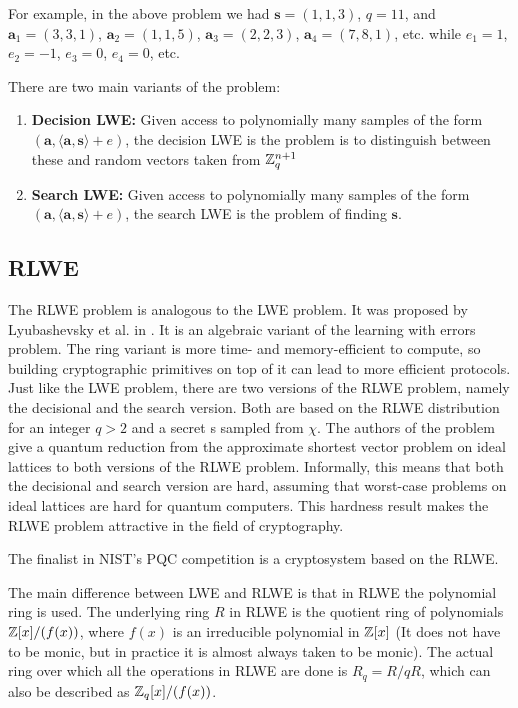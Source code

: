 \documentclass[12pt]{article}
\theoremstyle{plain}
\theoremstyle{definition}
\theoremstyle{remark}
\begin{document}
For example, in the above problem we had $\mathbf{s}=(1, 1, 3)$, $q=11$, and $\mathbf{a}_1 = (3,3,1)$, $\mathbf{a}_2 = (1,1,5)$, $\mathbf{a}_3 = (2,2,3)$, $\mathbf{a}_4 = (7,8,1)$, etc. while $e_1=1$, $e_2=-1$, $e_3=0$, $e_4=0$, etc.

There are two main variants of the problem:
\begin{enumerate}
    \item {\bf Decision LWE:} Given access to polynomially many samples of the form $(\mathbf{a}, \langle \mathbf{a}, \mathbf{s}\rangle+e)$, the decision LWE is the problem is to distinguish between these and random vectors taken from $\mathbb{Z}_q^{n+1}$
    \item {\bf Search LWE:} Given access to polynomially many samples of the form $(\mathbf{a}, \langle \mathbf{a}, \mathbf{s}\rangle+e)$, the search LWE is the problem of finding $\mathbf{s}$.
    \end{enumerate}

\subsection{RLWE} The RLWE problem is analogous to the LWE problem. It was proposed by
Lyubashevsky et al. in \cite{RLWE-1}. It is an algebraic variant of the learning with errors problem. The ring variant is more time- and memory-efficient to compute, so building
cryptographic primitives on top of it can lead to more efficient protocols. Just like the LWE problem, there are two versions of the RLWE problem, namely the decisional and the
search version. Both are based on the RLWE distribution for an integer $q > 2$ and
a secret s sampled from $\mathcal{\chi}$. The authors of the problem give a quantum reduction
from the approximate shortest vector problem on ideal lattices to both versions of
the RLWE problem. Informally, this means that both the decisional and search
version are hard, assuming that worst-case problems on ideal lattices are hard for
quantum computers. This hardness result makes the RLWE problem attractive in the field of cryptography.

The finalist in NIST's PQC competition is a cryptosystem based on the RLWE.

The main difference between LWE and RLWE is that in RLWE the polynomial ring is used. The underlying ring $R$ in RLWE is the quotient ring of polynomials $\mathbb{Z}[x]/(f(x))$, where $f(x)$ is an irreducible polynomial in $\mathbb{Z}[x]$ (It does not have to be monic, but in practice it is almost always taken to be monic). The actual ring over which all the operations in RLWE are done is $R_q = R/qR$, which can also be described as $\mathbb{Z}_q[x]/(f(x))$.
\end{document}
